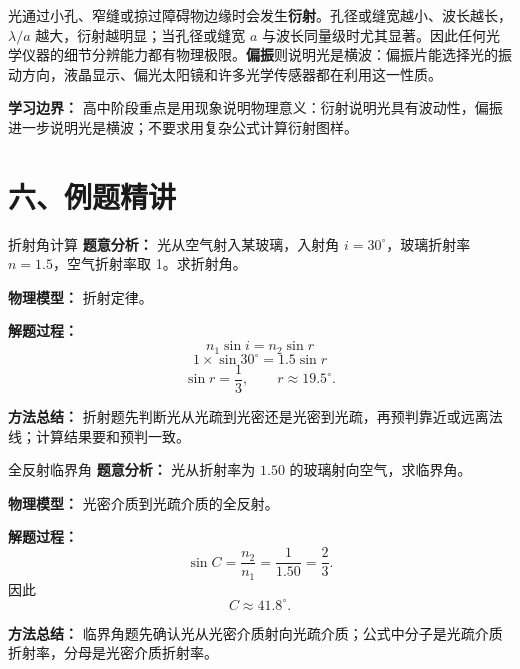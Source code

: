 光通过小孔、窄缝或掠过障碍物边缘时会发生\textbf{衍射}。孔径或缝宽越小、波长越长，$\lambda/a$ 越大，衍射越明显；当孔径或缝宽 $a$ 与波长同量级时尤其显著。因此任何光学仪器的细节分辨能力都有物理极限。\textbf{偏振}则说明光是横波：偏振片能选择光的振动方向，液晶显示、偏光太阳镜和许多光学传感器都在利用这一性质。

\begin{center}
\begin{minipage}{\linewidth}
\centering


\label{fig:optical-diffraction-polarization}
\end{minipage}
\end{center}

\textbf{学习边界：} 高中阶段重点是用现象说明物理意义：衍射说明光具有波动性，偏振进一步说明光是横波；不要求用复杂公式计算衍射图样。

\section*{六、例题精讲}

\begin{examplebox}{折射角计算}
\textbf{题意分析：} 光从空气射入某玻璃，入射角 $i=30^\circ$，玻璃折射率 $n=1.5$，空气折射率取 1。求折射角。

\textbf{物理模型：} 折射定律。

\begin{center}

\end{center}

\textbf{解题过程：}
\[
n_1\sin i=n_2\sin r
\]
\[
1\times\sin30^\circ=1.5\sin r
\]
\[
\sin r=\frac{1}{3},\qquad r\approx19.5^\circ.
\]

\textbf{方法总结：} 折射题先判断光从光疏到光密还是光密到光疏，再预判靠近或远离法线；计算结果要和预判一致。
\end{examplebox}

\begin{examplebox}{全反射临界角}
\textbf{题意分析：} 光从折射率为 $1.50$ 的玻璃射向空气，求临界角。

\textbf{物理模型：} 光密介质到光疏介质的全反射。

\begin{center}

\end{center}

\textbf{解题过程：}
\[
\sin C=\frac{n_2}{n_1}=\frac{1}{1.50}=\frac23.
\]
因此
\[
C\approx41.8^\circ.
\]

\textbf{方法总结：} 临界角题先确认光从光密介质射向光疏介质；公式中分子是光疏介质折射率，分母是光密介质折射率。
\end{examplebox}

